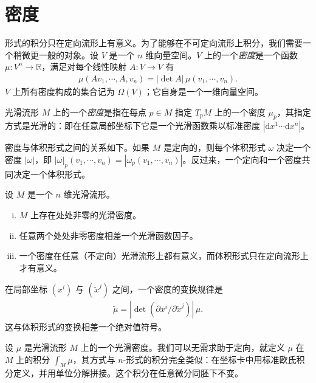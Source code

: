 \documentclass[../../main.tex]{subfiles}
\begin{document}
\section{密度}\label{section:ch16-densities}

形式的积分只在定向流形上有意义。为了能够在不可定向流形上积分，我们需要一个稍微更一般的对象。设 $V$ 是一个 $n$ 维向量空间。$V$ 上的一个\emph{密度}是一个函数 $\mu:V^n\to\mathbb{R}$，满足对每个线性映射 $A:V\to V$ 有
\begin{align*}
\mu(Av_1,\cdots ,A,v_n)=|\det A|\,\mu(v_1,\cdots ,v_n).
\end{align*}
$V$ 上所有密度构成的集合记为 $\Omega(V)$；它自身是一个一维向量空间。

\begin{definition}[流形上的密度]
光滑流形 $M$ 上的一个\emph{密度}是指在每点 $p\in M$ 指定 $T_pM$ 上的一个密度 $\mu_p$，其指定方式是光滑的：即在任意局部坐标下它是一个光滑函数乘以标准密度 $|\mathrm{d}x^1\cdots\mathrm{d}x^n|$。
\end{definition}

密度与体积形式之间的关系如下。如果 $M$ 是定向的，则每个体积形式 $\omega$ 决定一个密度 $|\omega|$，即 $|\omega|_p(v_1,\cdots ,v_n)=|\omega_p(v_1,\cdots ,v_n)|$。反过来，一个定向和一个密度共同决定一个体积形式。

\begin{proposition}[密度的性质]\label{proposition:ch16-properties-of-densities}
设 $M$ 是一个 $n$ 维光滑流形。
\begin{enumerate}[(i)]
\item $M$ 上存在处处非零的光滑密度。
\item 任意两个处处非零密度相差一个光滑函数因子。
\item 一个密度在任意（不定向）光滑流形上都有意义，而体积形式只在定向流形上才有意义。
\end{enumerate}
\end{proposition}

\begin{proposition}\label{proposition:ch16-density-change-of-coords}
在局部坐标 $(x^i)$ 与 $(\widetilde x^j)$ 之间，一个密度的变换规律是
\begin{align*}
\widetilde\mu=|\det(\partial x^i/\partial\widetilde x^j)|\,\mu.
\end{align*}
这与体积形式的变换相差一个绝对值符号。
\end{proposition}

\begin{proposition}\label{proposition:ch16-density-integration}
设 $\mu$ 是光滑流形 $M$ 上的一个光滑密度。我们可以无需求助于定向，就定义 $\mu$ 在 $M$ 上的积分 $\int_M\mu$，其方式与 $n$-形式的积分完全类似：在坐标卡中用标准欧氏积分定义，并用单位分解拼接。这个积分在任意微分同胚下不变。
\end{proposition}
\end{document}
